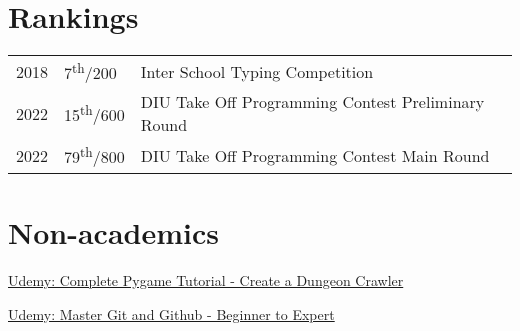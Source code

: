 \documentclass[]{deedy-resume-openfont}
\begin{document}
\begin{minipage}[t]{0.66\textwidth}

\section{Rankings} 
\begin{tabular}{rll}
2018	 & 7\textsuperscript{th}/200   & Inter School Typing Competition\\
2022	 & 15\textsuperscript{th}/600  & DIU Take Off Programming Contest Preliminary Round \\
2022	 & 79\textsuperscript{th}/800  & DIU Take Off Programming Contest Main Round \\
\end{tabular}
\sectionsep



\section{Non-academics}
\begin{tightemize} 
\item \href{https://www.udemy.com/course/pygame-dungeon-crawler/?referralCode=C1B3B7636B26BC1A7F1B&couponCode=ST15MT31224}{Udemy: Complete Pygame Tutorial - Create a Dungeon Crawler}
\item \href{https://www.udemy.com/certificate/UC-b3157d51-19c3-4510-a924-2206bc5a0903/}{Udemy: Master Git and Github - Beginner to Expert}
\end{tightemize}
\sectionsep



%
% 
% 

\end{minipage} 
\end{document}
